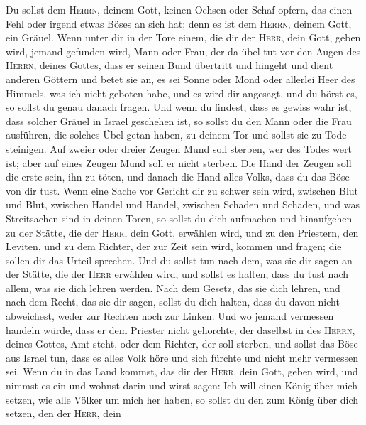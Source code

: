  Du sollst dem \textsc{Herrn}, deinem Gott, keinen Ochsen
oder Schaf opfern, das einen Fehl oder irgend etwas Böses an sich hat;
denn es ist dem \textsc{Herrn}, deinem Gott, ein Gräuel. 
Wenn unter dir in der Tore einem, die dir der \textsc{Herr}, dein Gott,
geben wird, jemand gefunden wird, Mann oder Frau, der da übel tut vor
den Augen des \textsc{Herrn}, deines Gottes, dass er seinen Bund
übertritt  und hingeht und dient anderen Göttern und betet
sie an, es sei Sonne oder Mond oder allerlei Heer des Himmels, was ich
nicht geboten habe,  und es wird dir angesagt, und du
hörst es, so sollst du genau danach fragen. Und wenn du findest, dass es
gewiss wahr ist, dass solcher Gräuel in Israel geschehen ist,
 so sollst du den Mann oder die Frau ausführen, die
solches Übel getan haben, zu deinem Tor und sollst sie zu Tode
steinigen.  Auf zweier oder dreier Zeugen Mund soll
sterben, wer des Todes wert ist; aber auf eines Zeugen Mund soll er
nicht sterben.  Die Hand der Zeugen soll die erste sein,
ihn zu töten, und danach die Hand alles Volks, dass du das Böse von dir
tust.  Wenn eine Sache vor Gericht dir zu schwer sein
wird, zwischen Blut und Blut, zwischen Handel und Handel, zwischen
Schaden und Schaden, und was Streitsachen sind in deinen Toren, so
sollst du dich aufmachen und hinaufgehen zu der Stätte, die der
\textsc{Herr}, dein Gott, erwählen wird,  und zu den
Priestern, den Leviten, und zu dem Richter, der zur Zeit sein wird,
kommen und fragen; die sollen dir das Urteil sprechen. 
Und du sollst tun nach dem, was sie dir sagen an der Stätte, die der
\textsc{Herr} erwählen wird, und sollst es halten, dass du tust nach
allem, was sie dich lehren werden.  Nach dem Gesetz, das
sie dich lehren, und nach dem Recht, das sie dir sagen, sollst du dich
halten, dass du davon nicht abweichest, weder zur Rechten noch zur
Linken.  Und wo jemand vermessen handeln würde, dass er
dem Priester nicht gehorchte, der daselbst in des \textsc{Herrn}, deines
Gottes, Amt steht, oder dem Richter, der soll sterben, und sollst das
Böse aus Israel tun,  dass es alles Volk höre und sich
fürchte und nicht mehr vermessen sei.  Wenn du in das
Land kommst, das dir der \textsc{Herr}, dein Gott, geben wird, und
nimmst es ein und wohnst darin und wirst sagen: Ich will einen König
über mich setzen, wie alle Völker um mich her haben,  so
sollst du den zum König über dich setzen, den der \textsc{Herr}, dein
